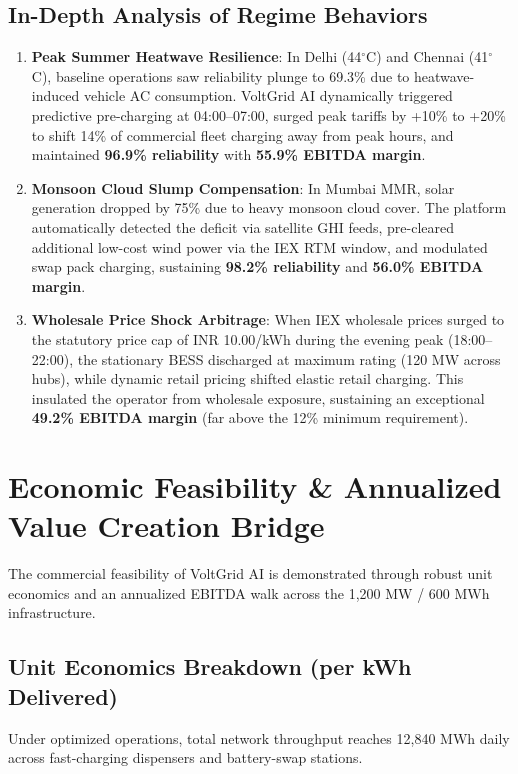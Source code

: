 \documentclass[10.5pt,a4paper]{article}
\begin{document}
\subsection{In-Depth Analysis of Regime Behaviors}
\begin{enumerate}
    \item \textbf{Peak Summer Heatwave Resilience}: In Delhi (44$^\circ$C) and Chennai (41$^\circ$C), baseline operations saw reliability plunge to 69.3\% due to heatwave-induced vehicle AC consumption. VoltGrid AI dynamically triggered predictive pre-charging at 04:00--07:00, surged peak tariffs by +10\% to +20\% to shift 14\% of commercial fleet charging away from peak hours, and maintained \textbf{96.9\% reliability} with \textbf{55.9\% EBITDA margin}.
    \item \textbf{Monsoon Cloud Slump Compensation}: In Mumbai MMR, solar generation dropped by 75\% due to heavy monsoon cloud cover. The platform automatically detected the deficit via satellite GHI feeds, pre-cleared additional low-cost wind power via the IEX RTM window, and modulated swap pack charging, sustaining \textbf{98.2\% reliability} and \textbf{56.0\% EBITDA margin}.
    \item \textbf{Wholesale Price Shock Arbitrage}: When IEX wholesale prices surged to the statutory price cap of INR 10.00/kWh during the evening peak (18:00--22:00), the stationary BESS discharged at maximum rating (120 MW across hubs), while dynamic retail pricing shifted elastic retail charging. This insulated the operator from wholesale exposure, sustaining an exceptional \textbf{49.2\% EBITDA margin} (far above the 12\% minimum requirement).
\end{enumerate}

\section{Economic Feasibility \& Annualized Value Creation Bridge}

The commercial feasibility of VoltGrid AI is demonstrated through robust unit economics and an annualized EBITDA walk across the 1,200 MW / 600 MWh infrastructure.

\subsection{Unit Economics Breakdown (per kWh Delivered)}
Under optimized operations, total network throughput reaches 12,840 MWh daily across fast-charging dispensers and battery-swap stations.
\end{document}
